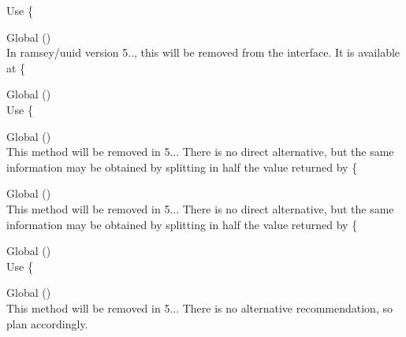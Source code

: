 \begin{DoxyRefList}
%
Use \{ 
\item[Global \doxylink{interface_ramsey_1_1_uuid_1_1_deprecated_uuid_interface_a80943d6026bc56930ebcf017ffcafd33}{Deprecated\+Uuid\+Interface\+::get\+Date\+Time} ()]\hfill \\
\label{deprecated__deprecated000353}%
%
In ramsey/uuid version 5.., this will be removed from the interface. It is available at \{ 
\item[Global \doxylink{interface_ramsey_1_1_uuid_1_1_deprecated_uuid_interface_a0254b872eba5ed13abb62c8f544973f5}{Deprecated\+Uuid\+Interface\+::get\+Fields\+Hex} ()]\hfill \\
\label{deprecated__deprecated000349}%
%
Use \{ 
\item[Global \doxylink{interface_ramsey_1_1_uuid_1_1_deprecated_uuid_interface_a9377d7086b7368a4b421dc3f0b72a8f6}{Deprecated\+Uuid\+Interface\+::get\+Least\+Significant\+Bits\+Hex} ()]\hfill \\
\label{deprecated__deprecated000354}%
%
This method will be removed in 5... There is no direct alternative, but the same information may be obtained by splitting in half the value returned by \{ 
\item[Global \doxylink{interface_ramsey_1_1_uuid_1_1_deprecated_uuid_interface_a5b313cc7e08a0010445eee725a978284}{Deprecated\+Uuid\+Interface\+::get\+Most\+Significant\+Bits\+Hex} ()]\hfill \\
\label{deprecated__deprecated000355}%
%
This method will be removed in 5... There is no direct alternative, but the same information may be obtained by splitting in half the value returned by \{ 
\item[Global \doxylink{interface_ramsey_1_1_uuid_1_1_deprecated_uuid_interface_a668b7447a6808eca31ab2d2281d11407}{Deprecated\+Uuid\+Interface\+::get\+Node\+Hex} ()]\hfill \\
\label{deprecated__deprecated000356}%
%
Use \{ 
\item[Global \doxylink{interface_ramsey_1_1_uuid_1_1_deprecated_uuid_interface_ab9e4dd24ec789a7e2b54a34edf098d2d}{Deprecated\+Uuid\+Interface\+::get\+Number\+Converter} ()]\hfill \\
\label{deprecated__deprecated000348}%
%
This method will be removed in 5... There is no alternative recommendation, so plan accordingly.  

\end{DoxyRefList}
